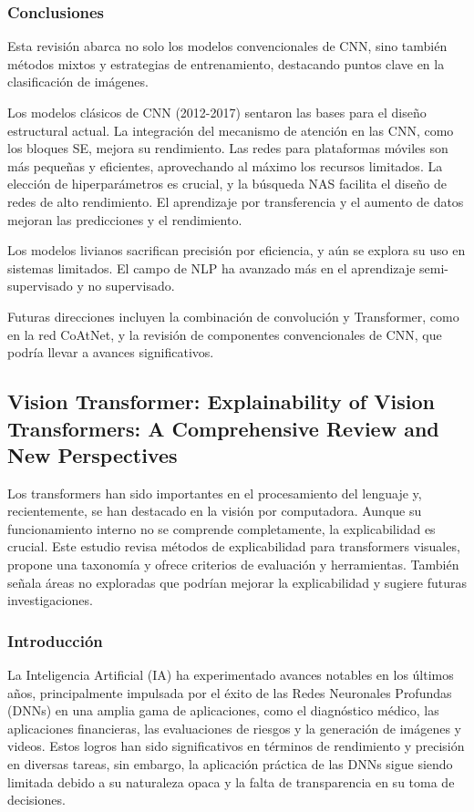 \subsubsection{Conclusiones} 
Esta revisión abarca no solo los modelos convencionales de CNN, sino también métodos mixtos y estrategias de entrenamiento, destacando puntos clave en la clasificación de imágenes.

Los modelos clásicos de CNN (2012-2017) sentaron las bases para el diseño estructural actual. La integración del mecanismo de atención en las CNN, como los bloques SE, mejora su rendimiento. Las redes para plataformas móviles son más pequeñas y eficientes, aprovechando al máximo los recursos limitados. La elección de hiperparámetros es crucial, y la búsqueda NAS facilita el diseño de redes de alto rendimiento. El aprendizaje por transferencia y el aumento de datos mejoran las predicciones y el rendimiento.

Los modelos livianos sacrifican precisión por eficiencia, y aún se explora su uso en sistemas limitados. El campo de NLP ha avanzado más en el aprendizaje semi-supervisado y no supervisado.

Futuras direcciones incluyen la combinación de convolución y Transformer, como en la red CoAtNet, y la revisión de componentes convencionales de CNN, que podría llevar a avances significativos.
\subsection{Vision Transformer: Explainability of Vision Transformers: A Comprehensive Review and New Perspectives \citep*{tecnica1}}
Los transformers han sido importantes en el procesamiento del lenguaje y, recientemente, se han destacado en la visión por computadora. Aunque su funcionamiento interno no se comprende completamente, la explicabilidad es crucial. Este estudio revisa métodos de explicabilidad para transformers visuales, propone una taxonomía y ofrece criterios de evaluación y herramientas. También señala áreas no exploradas que podrían mejorar la explicabilidad y sugiere futuras investigaciones.

\subsubsection{Introducción}
La Inteligencia Artificial (IA) ha experimentado avances notables en los últimos años, principalmente impulsada por el éxito de las Redes Neuronales Profundas (DNNs) en una amplia gama de aplicaciones, como el diagnóstico médico, las aplicaciones financieras, las evaluaciones de riesgos y la generación de imágenes y videos. Estos logros han sido significativos en términos de rendimiento y precisión en diversas tareas, sin embargo, la aplicación práctica de las DNNs sigue siendo limitada debido a su naturaleza opaca y la falta de transparencia en su toma de decisiones.

